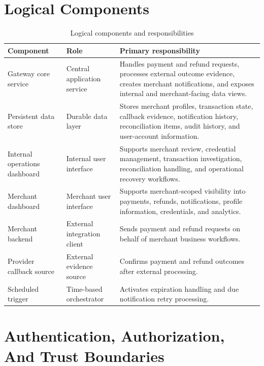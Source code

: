 \section{Logical Components}

\begin{table}[!htbp]
\centering
\caption{Logical components and responsibilities}
\begin{tabularx}{\textwidth}{L{0.24\textwidth}L{0.22\textwidth}Y}
\toprule
\textbf{Component} & \textbf{Role} & \textbf{Primary responsibility} \\
\midrule
Gateway core service & Central application service & Handles payment and refund requests, processes external outcome evidence, creates merchant notifications, and exposes internal and merchant-facing data views. \\
\bodyrowrule
Persistent data store & Durable data layer & Stores merchant profiles, transaction state, callback evidence, notification history, reconciliation items, audit history, and user-account information. \\
\bodyrowrule
Internal operations dashboard & Internal user interface & Supports merchant review, credential management, transaction investigation, reconciliation handling, and operational recovery workflows. \\
\bodyrowrule
Merchant dashboard & Merchant user interface & Supports merchant-scoped visibility into payments, refunds, notifications, profile information, credentials, and analytics. \\
\bodyrowrule
Merchant backend & External integration client & Sends payment and refund requests on behalf of merchant business workflows. \\
\bodyrowrule
Provider callback source & External evidence source & Confirms payment and refund outcomes after external processing. \\
\bodyrowrule
Scheduled trigger & Time-based orchestrator & Activates expiration handling and due notification retry processing. \\
\bottomrule
\end{tabularx}
\end{table}

\section{Authentication, Authorization, And Trust Boundaries}

